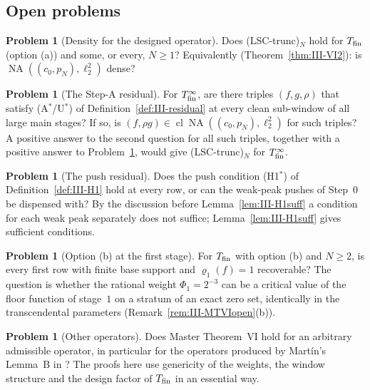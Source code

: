 \documentclass[10pt]{amsart}
\theoremstyle{definition}
\newtheorem{problem}[theorem]{Problem}
\theoremstyle{remark}
\newcommand{\NA}{\operatorname{NA}}
\newcommand{\cl}{\operatorname{cl}}
\begin{document}
\subsection{Open problems}
\begin{problem}[Density for the designed operator]\label{prob:III-LSC}
Does \textup{(LSC-trunc)$_N$} hold for $T_{\rm fin}$ \textup{(}option
\textup{(a))} and some, or every, $N\ge1$?  Equivalently
\textup{(}Theorem~\textup{\ref{thm:III-VI2})}: is $\NA((c_0,p_N),\ell_2^2)$ dense?
\end{problem}

\begin{problem}[The Step-A residual]\label{prob:III-Astar}
For $T^\infty_{\rm fin}$, are there triples $(f,g,\rho)$ that satisfy
\textup{(A$^*$/U$^*$)} of
Definition~\textup{\ref{def:III-residual}} at every clean sub-window of all
large main stages?  If so, is $(f,\rho g)\in\cl\NA((c_0,p_N),\ell_2^2)$ for
such triples?  A positive answer to the second question for all such triples,
together with a positive answer to Problem~\textup{\ref{prob:III-Wstar}}, would give
\textup{(LSC-trunc)$_N$} for $T^\infty_{\rm fin}$.
\end{problem}

\begin{problem}[The push residual]\label{prob:III-Wstar}
Does the push condition \textup{(H1$^*$)} of
Definition~\textup{\ref{def:III-H1}} hold at every row, or can the weak-peak
pushes of Step~$0$ be dispensed with?  By the discussion before
Lemma~\textup{\ref{lem:III-H1suff}} a condition for each weak peak separately
does not suffice; Lemma~\textup{\ref{lem:III-H1suff}} gives sufficient
conditions.
\end{problem}

\begin{problem}[Option (b) at the first stage]\label{prob:III-optb}
For $T_{\rm fin}$ with option \textup{(b)} and $N\ge2$, is every first row with
finite base support and $\varrho_1(f)=1$ recoverable?  The question is whether
the rational weight $\Phi_1=2^{-3}$ can be a critical value of the floor
function of stage~$1$ on a stratum of an exact zero set, identically in the
transcendental parameters \textup{(}Remark~\textup{\ref{rem:III-MTVIopen}(b))}.
\end{problem}

\begin{problem}[Other operators]\label{prob:III-other}
Does Master Theorem~VI hold for an arbitrary admissible operator, in
particular for the operators produced by Mart\'in's Lemma~B in
\cite{Martin}?  The proofs here use genericity of the weights, the window
structure and the design factor of $T_{\rm fin}$ in an essential way.
\end{problem}
\end{document}

